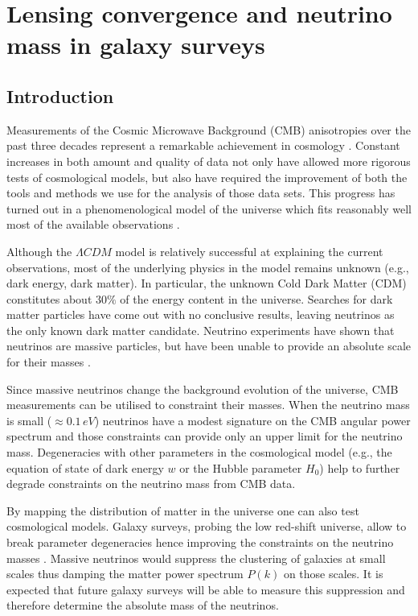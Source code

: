 \chapter{Lensing convergence and neutrino mass in galaxy surveys}
\label{chapter-mnu}

\section{Introduction}
\label{chapter-mnu:introduction}

Measurements of the Cosmic Microwave Background (CMB) anisotropies over the past three decades represent a remarkable achievement in cosmology \cite{Smoot:1992td,Bennett:2003bz,Ade:2013sjv}. Constant increases in both amount and quality of data not only have allowed more rigorous tests of cosmological models, but also have required the improvement of both the tools and methods we use for the analysis of those data sets. This progress has turned out in a phenomenological model of the universe which fits reasonably well most of the available observations \cite{Ade:2015xua}.    

Although the $\Lambda CDM$ model is relatively successful at explaining the current observations, most of the underlying physics in the model remains unknown (e.g., dark energy, dark matter). In particular, the unknown Cold Dark Matter (CDM) constitutes about $30\%$ of the energy content in the universe. Searches for dark matter particles have come out with no conclusive results, leaving neutrinos as the only known dark matter candidate. Neutrino experiments have shown that neutrinos are massive particles, but have been unable to provide an absolute scale for their masses \cite{Lesgourgues:2006nd,Lesgourgues:2012uu}. 

Since massive neutrinos change the background evolution of the universe, CMB measurements can be utilised to constraint their masses. When the neutrino mass is small ($\approx 0.1 \, \mathit{eV}$) neutrinos have a modest signature on the CMB angular power spectrum and those constraints can provide only an upper limit for the neutrino mass. Degeneracies with other parameters in the cosmological model (e.g., the equation of state of dark energy $w$ or the Hubble parameter $H_0$) help to further degrade constraints on the neutrino mass from CMB data.  
   
By mapping the distribution of matter in the universe one can also test cosmological models. Galaxy surveys, probing the low red-shift universe, allow to break parameter degeneracies hence improving the constraints on the neutrino masses  \cite{Hu:1997mj}. Massive neutrinos would suppress the clustering of galaxies at small scales thus damping the matter power spectrum $P(k)$ on those scales. It is expected that future galaxy surveys will be able to measure this suppression and therefore determine the  absolute mass of the neutrinos.  
  
